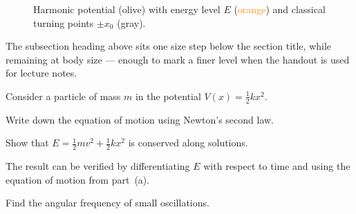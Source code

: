 \documentclass[11pt]{article}
\begin{document}
\begin{figure}[ht]
  \centering
  \caption{Harmonic potential (\textcolor{darkolive}{olive}) with energy
           level $E$ (\textcolor{darkorange}{orange}) and classical turning points $\pm x_0$ (gray).}
  \label{fig:potential}
\end{figure}

The subsection heading above sits one size step below the section title, while remaining at body size --- enough to mark a finer level when the handout is used for lecture notes.


\begin{exercise}
Consider a particle of mass $m$ in the potential $V(x) = \tfrac{1}{2}kx^2$.

\begin{subproblems}
  \item Write down the equation of motion using Newton's second law.
  \item Show that $E = \tfrac{1}{2}mv^2 + \tfrac{1}{2}kx^2$ is conserved along solutions.
\end{subproblems}

The result can be verified by differentiating $E$ with respect to time and using the equation of motion from part~(a).

\begin{subproblems}[resume]
  \item Find the angular frequency of small oscillations.
\end{subproblems}
\end{exercise}
\end{document}
